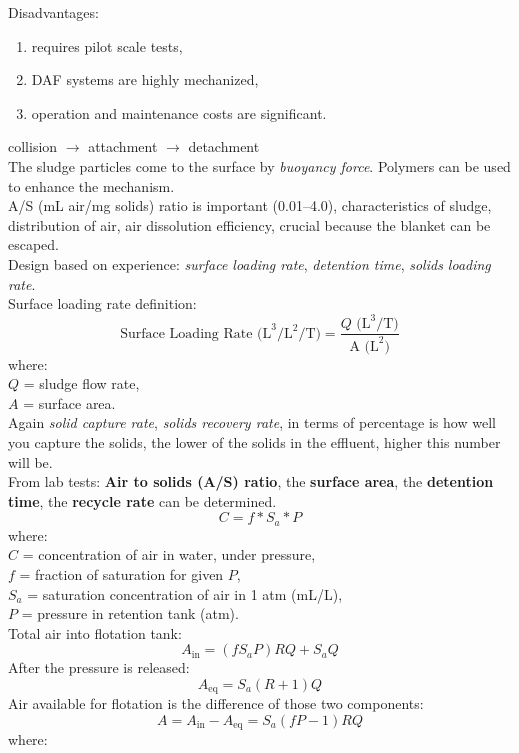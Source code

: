 \documentclass{article}
\numberwithin{equation}{section}
\begin{document}
Disadvantages:
\begin{enumerate}
    \item requires pilot scale tests,
    \item DAF systems are highly mechanized,
    \item operation and maintenance costs are significant.
\end{enumerate}
collision $\rightarrow$ attachment $\rightarrow$ detachment\\
The sludge particles come to the surface by \emph{buoyancy force}. Polymers can be used to enhance the mechanism.\\
A/S (mL air/mg solids) ratio is important (0.01--4.0), characteristics of sludge, distribution of air, air dissolution efficiency, crucial because the blanket can be escaped.\\
Design based on experience: \emph{surface loading rate}, \emph{detention time}, \emph{solids loading rate}.\\
Surface loading rate definition:
\[
\text {Surface Loading Rate} \text{ (L}^3/\text{L}^2/\text{T)} = \frac{Q\text{ (L}^3\text{/T)}}{\text{A (L}^2\text{)}} 
\]
where:\\
$Q$ = sludge flow rate,\\
$A$ = surface area.\\
Again \emph{solid capture rate}, \emph{solids recovery rate}, in terms of percentage is how well you capture the solids, the lower of the solids in the effluent, higher this number will be.\\
From lab tests: \textbf{Air to solids (A/S) ratio}, the \textbf{surface area}, the \textbf{detention time}, the \textbf{recycle rate} can be determined.
\[
C = f * S_a * P
\]
where:\\
$C$ = concentration of air in water, under pressure,\\
$f$ = fraction of saturation for given $P$,\\
$S_a$ = saturation concentration of air in 1 atm (mL/L),\\
$P$ = pressure in retention tank (atm).\\
Total air into flotation tank:
\[
A_{\text{in}} = (fS_aP)RQ+S_aQ
\]
After the pressure is released:
\[
A_{\text{eq}} = S_a(R+1)Q
\]
Air available for flotation is the difference of those two components:
\begin{equation}
    A = A_{\text{in}} - A_{\text{eq}}= S_a(fP-1)RQ \label{eq:air}
\end{equation}
where:\\
\end{document}
